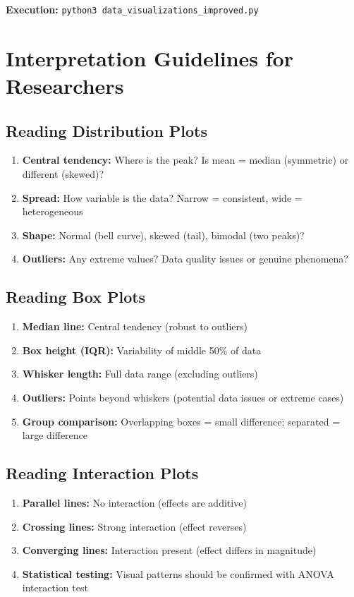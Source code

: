 \documentclass[12pt,a4paper]{article}
\begin{document}
\textbf{Execution:} \texttt{python3 data\_visualizations\_improved.py}

\newpage
\section{Interpretation Guidelines for Researchers}

\subsection{Reading Distribution Plots}

\begin{enumerate}
    \item \textbf{Central tendency:} Where is the peak? Is mean = median (symmetric) or different (skewed)?
    \item \textbf{Spread:} How variable is the data? Narrow = consistent, wide = heterogeneous
    \item \textbf{Shape:} Normal (bell curve), skewed (tail), bimodal (two peaks)?
    \item \textbf{Outliers:} Any extreme values? Data quality issues or genuine phenomena?
\end{enumerate}

\subsection{Reading Box Plots}

\begin{enumerate}
    \item \textbf{Median line:} Central tendency (robust to outliers)
    \item \textbf{Box height (IQR):} Variability of middle 50\% of data
    \item \textbf{Whisker length:} Full data range (excluding outliers)
    \item \textbf{Outliers:} Points beyond whiskers (potential data issues or extreme cases)
    \item \textbf{Group comparison:} Overlapping boxes = small difference; separated = large difference
\end{enumerate}

\subsection{Reading Interaction Plots}

\begin{enumerate}
    \item \textbf{Parallel lines:} No interaction (effects are additive)
    \item \textbf{Crossing lines:} Strong interaction (effect reverses)
    \item \textbf{Converging lines:} Interaction present (effect differs in magnitude)
    \item \textbf{Statistical testing:} Visual patterns should be confirmed with ANOVA interaction test
\end{enumerate}
\end{document}
